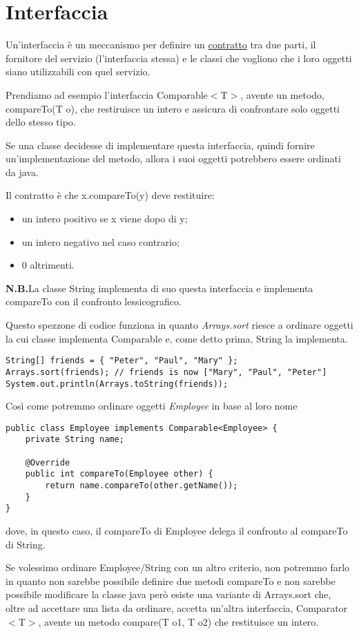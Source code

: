 \section{Interfaccia}
Un'interfaccia è un meccanismo per definire un \underline{contratto} tra due parti, il fornitore del servizio (l'interfaccia stessa) e le classi che vogliono 
che i loro oggetti siano utilizzabili con quel servizio.
\smallskip

Prendiamo ad esempio l'interfaccia Comparable$<$T$>$, avente un metodo, compareTo(T o), che restiruisce un intero e assicura di confrontare solo oggetti dello 
stesso tipo.

Se una classe decidesse di implementare questa interfaccia, quindi fornire un'implementazione del metodo, allora i suoi oggetti potrebbero essere ordinati da 
java.

Il contratto è che x.compareTo(y) deve restituire:
\begin{itemize}
    \item un intero positivo se x viene dopo di y;
    \item un intero negativo nel caso contrario;
    \item 0 altrimenti.
\end{itemize}

\textbf{N.B.}La classe String implementa di suo questa interfaccia e implementa compareTo con il confronto lessicografico.

\medskip
Questo spezzone di codice funziona in quanto \textit{Arrays.sort} riesce a ordinare oggetti la cui classe implementa Comparable e, come detto prima, String la 
implementa.
\begin{lstlisting}
String[] friends = { "Peter", "Paul", "Mary" };
Arrays.sort(friends); // friends is now ["Mary", "Paul", "Peter"]
System.out.println(Arrays.toString(friends));
\end{lstlisting}

Così come potremmo ordinare oggetti \textit{Employee} in base al loro nome
\begin{lstlisting}
public class Employee implements Comparable<Employee> {
    private String name;

    @Override
    public int compareTo(Employee other) {
        return name.compareTo(other.getName());
    }
}
\end{lstlisting}
dove, in questo caso, il compareTo di Employee delega il confronto al compareTo di String.
\smallskip

Se volessimo ordinare Employee/String con un altro criterio, non potremmo farlo in quanto non sarebbe possibile definire due metodi compareTo e non sarebbe possibile
modificare la classe java però esiste una variante di Arrays.sort che, oltre ad accettare una lista da ordinare, accetta un'altra interfaccia, Comparator$<$T$>$, 
avente un metodo compare(T o1, T o2) che restituisce un intero.

